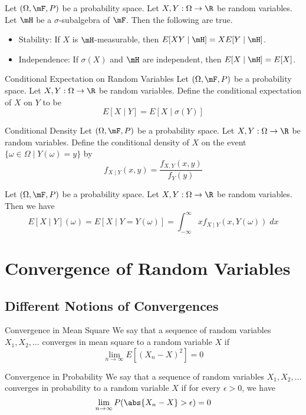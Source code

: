\documentclass[a4paper]{article}
\begin{document}
\begin{lmm}{}{} Let $(\Omega,\mF,P)$ be a probability space. Let $X,Y:\Omega\to\R$ be random variables. Let $\mH$ be a $\sigma$-subalgebra of $\mF$. Then the following are true. 
\begin{itemize}
\item Stability: If $X$ is $\mH$-measurable, then $E[XY\;|\;\mH]=XE[Y\;|\;\mH]$. 
\item Independence: If $\sigma(X)$ and $\mH$ are independent, then $E[X\;|\;\mH]=E[X]$. 
\end{itemize}
\end{lmm}

\begin{defn}{Conditional Expectation on Random Variables}{} Let $(\Omega,\mF,P)$ be a probability space. Let $X,Y:\Omega\to\R$ be random variables. Define the conditional expectation of $X$ on $Y$ to be $$E[X\;|\;Y]=E[X\;|\;\sigma(Y)]$$
\end{defn}

\begin{defn}{Conditional Density}{} Let $(\Omega,\mF,P)$ be a probability space. Let $X,Y:\Omega\to\R$ be random variables. Define the conditional density of $X$ on the event $\{\omega\in\Omega\;|\;Y(\omega)=y\}$ by $$f_{X\;|\;Y}(x,y)=\frac{f_{X,Y}(x,y)}{f_Y(y)}$$
\end{defn}

\begin{lmm}{}{} Let $(\Omega,\mF,P)$ be a probability space. Let $X,Y:\Omega\to\R$ be random variables. Then we have $$E[X\;|\;Y](\omega)=E[X\;|\;Y=Y(\omega)]=\int_{-\infty}^\infty xf_{X\;|\;Y}(x,Y(\omega))\;dx$$
\end{lmm}

\pagebreak
\section{Convergence of Random Variables}
\subsection{Different Notions of Convergences}
\begin{defn}{Convergence in Mean Square}{} We say that a sequence of random variables $X_1,X_2,\dots$ converges in mean square to a random variable $X$ if $$\lim_{n\to\infty}E[(X_n-X)^2]=0$$
\end{defn}

\begin{defn}{Convergence in Probability}{} We say that a sequence of random variables $X_1,X_2,\dots$ converges in probability to a random variable $X$ if for every $\epsilon>0$, we have $$\lim_{n\to\infty}P(\abs{X_n-X}>\epsilon)=0$$
\end{defn}
\end{document}
